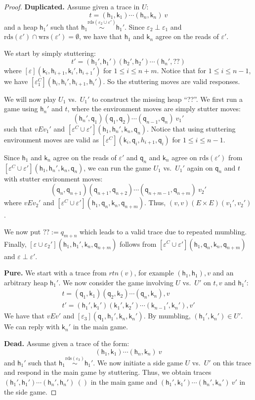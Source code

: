 \documentclass[nocopyrightspace,preprint]{sigplanconf}
\newcommand{\rdsin}[1]{\mathrm{rds}({#1})}
\newcommand{\wrsin}[1]{\mathrm{wrs}({#1})}
\newcommand{\eff}{\varepsilon}
\newcommand\q{\ensuremath{\mathsf{q}}\xspace}
\newcommand\heap{\ensuremath{\mathsf{h}}\xspace}
\newcommand\h{\heap}
\renewcommand\k{\ensuremath{\mathsf{k}}\xspace}
\newcommand\rloc[3]{\ensuremath{#1 \stackrel{#3}{\sim} #2}}
\begin{document}
\begin{proof}
\textbf{Duplicated.}
Assume given a trace in $U$:
\[
  t = (\h_1,\k_1) \cdots (\h_n,\k_n) \ v
\]
and a heap $\h_1'$ such that $\rloc{\h_1}{\h_1'}{\rdsin{\eff_2 \cup \eff'}}$. Since $\eff_2 \perp \eff_1$ and $\rdsin{\eff'} \cap \wrsin{\eff'} = \emptyset$, we have that $\h_1$ and $\k_n$ agree on the reads of $\eff'$.

We start by simply stuttering:
\[
 t' =  (\h_1',\h_1') (\h_2',\h_2') \cdots (\h_n',??)
\]
where $[\eff] (\k_i,\h_{i+1},\k_i',\h_{i+1}')$ for $1 \leq i \leq n+m$. Notice that for $1 \leq i \leq n-1$, we have $[\eff_1^C](\h_i,\h_i',\h_{i+1},\h_i')$. So the stuttering moves are valid responses. 

We will now play $U_1$ vs.\ $U_1'$ to construct the missing heap ``??''. We first run a game using $\h_n'$ and $t$, where the environment moves are simply stutter moves:
\[
  (\h_n',\q_1) (\q_1,\q_2) \cdots (\q_{n-1},\q_n)\ v_1'
\]
such that $v E v_1'$ and $[\eff^C \cup \eff'](\h_1,\h_n',\k_n,\q_n)$. Notice that using stuttering environment moves are valid as $[\eff^C](\k_i,\q_i,h_{i+1},\q_i)$ for $1 \leq i \leq n-1$.

Since $\h_1$ and $\k_n$ agree on the reads of $\eff'$ and $\q_n$ and $\k_n$ agree on $\rdsin{\eff'}$ from $[\eff^C \cup \eff'](\h_1,\h_n',\k_n,\q_n)$, we can run the game $U_1$ vs.\ $U_1'$ again on $\q_n$ and $t$ with stutter environment moves:
\[
  (\q_n,\q_{n+1}) (\q_{n+1},\q_{n+2}) \cdots (\q_{n+m-1},\q_{n+m})\ v_2'
\]
where $v E v_2'$ and $[\eff^C \cup \eff'](\h_1,\q_n,\k_n,\q_{n+m})$. Thus, $(v, v) (E \times E) (v_1', v_2')$. 

We now put $??:=q_{m+n}$ which leads to a valid trace due to repeated mumbling.  Finally, 
$[\eff \cup \eff_2'](\h_1, \h_1', \k_n, \q_{n+m})$ follows
from $[\eff^C \cup \eff'](\h_1,\q_n,\k_n,\q_{n+m})$ and $\eff \perp \eff'$.

\textbf{Pure.}
We start with a trace from $\textit{rtn}(v)$, for example $(\h_1, \h_1),v$ and an arbitrary heap $\h_1'$. We now consider the game involving $U$ vs.\ $U'$ on $t,v$ and $\h_1'$:
\[
\begin{array}{l}
  t = (\q_1,\k_1)(\q_2,\k_2) \cdots (\q_n,\k_n), v\\
  t'= (\h_1',\k_1') (\k_1',\k_2') \cdots (\k_{n-1}',\k_n'), v'
\end{array}
\]
We have that $v E v'$ and $[\eff_3](\q_1,\h_1',\k_n,\k_n')$. By mumbling, $(\h_1',\k_n') \in U'$. We can reply with $\k_n'$ in the main game.

\textbf{Dead.} 
Assume given a trace of the form:
\[
  (\h_1,\k_1) \cdots (\h_n,\k_n)  \ v
\]
and $\h_1'$ such that $\rloc{\h_1}{\h_1'}{\rdsin{\eff_3}}$. We now
initiate a side game $U$ vs.\ $U'$ on this trace and respond in the
main game by stuttering. Thus, we obtain traces $(\h_1', \h_1') \cdots
(\h_n',\h_n') \ ()$ in the main game and $(\h_1', \k_1') \cdots
(\h_n',\k_n') \ v'$ in the side game.


\end{proof}
\end{document}
